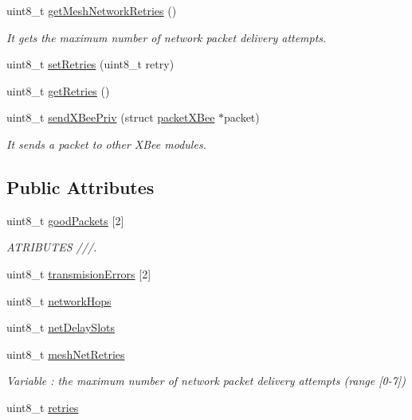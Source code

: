 \begin{DoxyCompactItemize}
uint8\+\_\+t \hyperlink{class_wasp_x_bee_d_m_a86effdefa9423dafd9f3a83f28ebb105}{get\+Mesh\+Network\+Retries} ()
\begin{DoxyCompactList}\small\item\em It gets the maximum number of network packet delivery attempts. \end{DoxyCompactList}\item 
uint8\+\_\+t \hyperlink{class_wasp_x_bee_d_m_aa24fee61d07b3690f3ace3a1ce22db34}{set\+Retries} (uint8\+\_\+t retry)
\item 
uint8\+\_\+t \hyperlink{class_wasp_x_bee_d_m_a47bdc4d6d47d71f6e12da64ea17f1ca7}{get\+Retries} ()
\item 
uint8\+\_\+t \hyperlink{class_wasp_x_bee_d_m_a57fa8ab47b3fd356cd40de42cb7b4bdc}{send\+X\+Bee\+Priv} (struct \hyperlink{structpacket_x_bee}{packet\+X\+Bee} $\ast$packet)
\begin{DoxyCompactList}\small\item\em It sends a packet to other X\+Bee modules. \end{DoxyCompactList}\end{DoxyCompactItemize}
\subsection*{Public Attributes}
\begin{DoxyCompactItemize}
\item 
uint8\+\_\+t \hyperlink{class_wasp_x_bee_d_m_a7b3307adc604b9f2d603ae9cdc050f07}{good\+Packets} \mbox{[}2\mbox{]}
\begin{DoxyCompactList}\small\item\em A\+T\+R\+I\+B\+U\+T\+ES ///. \end{DoxyCompactList}\item 
uint8\+\_\+t \hyperlink{class_wasp_x_bee_d_m_ac69aa4bfd16eac93d3e1fb93ad4b41cd}{transmision\+Errors} \mbox{[}2\mbox{]}
\item 
uint8\+\_\+t \hyperlink{class_wasp_x_bee_d_m_ab31869e8f1dc35ded13fbe9c235fe95d}{network\+Hops}
\item 
uint8\+\_\+t \hyperlink{class_wasp_x_bee_d_m_ad01ffb7f948e6cf3abe109de0272e54a}{net\+Delay\+Slots}
\item 
uint8\+\_\+t \hyperlink{class_wasp_x_bee_d_m_a5feb709c24b31b682fa198cf1d38fa60}{mesh\+Net\+Retries}\hypertarget{class_wasp_x_bee_d_m_a5feb709c24b31b682fa198cf1d38fa60}{}\label{class_wasp_x_bee_d_m_a5feb709c24b31b682fa198cf1d38fa60}

\begin{DoxyCompactList}\small\item\em Variable \+: the maximum number of network packet delivery attempts (range \mbox{[}0-\/7\mbox{]}) \end{DoxyCompactList}\item 
uint8\+\_\+t \hyperlink{class_wasp_x_bee_d_m_a71a8d4f44010a7660147da19f814bfb3}{retries}
\end{DoxyCompactItemize}
